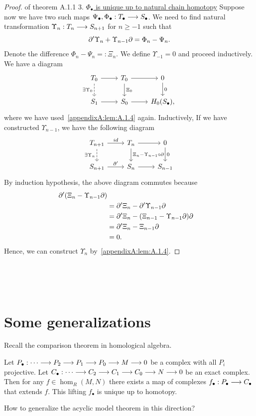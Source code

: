 \documentclass[11pt]{book} %
\begin{document}
\begin{proof}{of theorem A.1.1}
3. \underline{$\Phi_\bullet$ is unique up to natural chain homotopy} Suppose now we have two such maps $\Psi_\bullet,\Phi_\bullet: T_\bullet\longrightarrow S_\bullet$. We need to find natural transformation $\Upsilon_n: T_{n}\longrightarrow S_{n+1}$ for $n\geq -1$ such that 
$$
{\partial}'\Upsilon_n+\Upsilon_{n-1}{\partial}=\Phi_n-\Psi_n.
$$
Denote the difference $\Phi_n-\Psi_n=:\Xi_n$. We define $\Upsilon_{-1}=0$ and proceed inductively. We have a diagram
\[
\begin{tikzcd}
T_0 \arrow[r] \arrow[d, "\exists\Upsilon_0"', dashed] & T_0 \arrow[d, "\Xi_0"] \arrow[r] & 0 \arrow[d, "0"] \\
S_1 \arrow[r] & S_0 \arrow[r] & H_0(S_\bullet),
\end{tikzcd}
\]
where we have used~\ref{appendixA:lem:A.1.4} again. Inductively, If we have constructed $\Upsilon_{n-1}$, we have the following diagram
\[
\begin{tikzcd}
T_{n+1} \arrow[r, "id"] \arrow[d, "\exists \Upsilon_{n}"', dashed] & T_n \arrow[d, "\Xi_n-\Upsilon_{n-1}\circ\pd"] \arrow[r] & 0 \arrow[d, "0"] \\
S_{n+1} \arrow[r, "\pd'"] & S_n \arrow[r] & S_{n-1}
\end{tikzcd}
\] 
By induction hypothesis, the above diagram commutes because
$$
\begin{aligned}
{\partial}'(\Xi_n-\Upsilon_{n-1}{\partial})\\
&={\partial}'\Xi_n-{\partial}'\Upsilon_{n-1}{\partial}\\
&={\partial}'\Xi_n-(\Xi_{n-1}-\Upsilon_{n-1}{\partial}){\partial}\\
&={\partial}'\Xi_n-\Xi_{n-1}{\partial}\\
&=0.
\end{aligned}
$$
Hence, we can construct $\Upsilon_{n}$ by~\ref{appendixA:lem:A.1.4}.
\end{proof}
\ \\
\ \\
\ \\


\section{Some generalizations}
Recall the comparison theorem in homological algebra.
\begin{theorem}
Let $P_\bullet: \cdots\longrightarrow P_2\longrightarrow P_1\longrightarrow P_0\longrightarrow M\longrightarrow 0$ be a complex with all $P_i$ projective. Let $C_\bullet: \cdots\longrightarrow C_2\longrightarrow C_1\longrightarrow C_0\longrightarrow N\longrightarrow 0$ be an exact complex. Then for any $f\in \hom_R(M,N)$ there exists a map of complexes $f_\bullet: P_\bullet\longrightarrow C_\bullet$ that extends $f$. This lifting $f_\bullet$ is unique up to homotopy.
\end{theorem}
How to generalize the acyclic model theorem in this direction?
\end{document}

